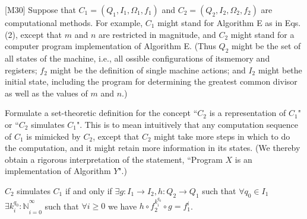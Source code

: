 \documentclass{amsart}
\begin{document}
\begin{problem}{[}M30{]}
  Suppose that \(C_1 = (Q_1, I_1, \Omega_1, f_1)\) and
  \(C_2 = (Q_2, I_2, \Omega_2, f_2)\) are computational methods. For example,
  \(C_1\) might stand for Algorithm E as in Eqs. (2), except that \(m\) and
  \(n\) are restricted in magnitude, and \(C_2\) might stand for a computer
  program implementation of Algorithm E. (Thus \(Q_2\) might be the set of all
  states of the machine, i.e., all ossible configurations of itsmemory and
  registers; \(f_2\) might be the definition of single machine actions; and
  \(I_2\) might bethe initial state, including the program for determining the
  greatest common divisor as well as the values of \(m\) and \(n\).)

  Formulate a set-theoretic definition for the concept ``\(C_2\) is a
  representation of \(C_1\)" or ``\(C_2\) simulates \(C_1\)". This is to mean
  intuitively that any computation sequence of \(C_1\) is mimicked by \(C_2\),
  except that \(C_2\) might take more steps in which to do the computation, and
  it might retain more information in its states. (We thereby obtain a rigorous
  interpretation of the statement, ``Program \(X\) is an implementation of
  Algorithm \(Y\)".)
\end{problem}

\begin{solution}
\begin{definition}
  \(C_2\) simulates \(C_1\) if and only if
  \(\exists g : I_1 \to I_2, h : Q_2 \to Q_1\) such that \(\forall q_0 \in I_1\)
  \(\exists {k_i^{q_0} : \mathbb{N}}_{i=0}^\infty\) such that \(\forall i \geq 0\) we
  have \(h \circ f_2^{k_i^{q_0}} \circ g = f_1^i\).
\end{definition}
\end{solution}
\end{document}
